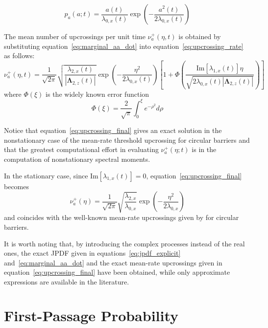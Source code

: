 \documentclass[11pt]{article}
\begin{document}
\begin{equation}
p_a(a; t) = \frac{a(t)}{\lambda_{0,x}(t)} \exp\left(-\frac{a^2(t)}{2\lambda_{0,x}(t)}\right)
\label{eq:marginal_a}
\end{equation}

The mean number of upcrossings per unit time $\nu_a^+(\eta, t)$ is obtained by substituting equation~\eqref{eq:marginal_aa_dot} into equation~\eqref{eq:upcrossing_rate} as follows:
\begin{equation}
\nu_a^+(\eta, t) = \frac{1}{\sqrt{2\pi}} \sqrt{\frac{\lambda_{2,x}(t)}{|\boldsymbol{\Lambda}_{2,z}(t)|}} \exp\left(-\frac{\eta^2}{2\lambda_{0,x}(t)}\right) \left[1 + \Phi\left(\frac{\mathrm{Im}[\lambda_{1,x}(t)]\eta}{\sqrt{2\lambda_{0,x}(t)|\boldsymbol{\Lambda}_{2,z}(t)|}}\right)\right]
\label{eq:upcrossing_final}
\end{equation}
where $\Phi(\xi)$ is the widely known error function
\begin{equation}
\Phi(\xi) = \frac{2}{\sqrt{\pi}} \int_0^{\xi} e^{-\rho^2} d\rho
\label{eq:error_function}
\end{equation}

Notice that equation~\eqref{eq:upcrossing_final} gives an exact solution in the nonstationary case of the mean-rate threshold upcrossing for circular barriers and that the greatest computational effort in evaluating $\nu_a^+(\eta; t)$ is in the computation of nonstationary spectral moments.

In the stationary case, since $\mathrm{Im}[\lambda_{1,x}(t)] = 0$, equation~\eqref{eq:upcrossing_final} becomes
\begin{equation}
\nu_a^+(\eta) = \frac{1}{\sqrt{2\pi}} \sqrt{\frac{\lambda_{2,x}}{\lambda_{0,x}}} \exp\left(-\frac{\eta^2}{2\lambda_{0,x}}\right)
\label{eq:stationary_upcrossing}
\end{equation}
and coincides with the well-known mean-rate upcrossings given by \cite{cramer1967} for circular barriers.

It is worth noting that, by introducing the complex processes instead of the real ones, the exact JPDF given in equations~\eqref{eq:jpdf_explicit} and~\eqref{eq:marginal_aa_dot} and the exact mean-rate upcrossings given in equation~\eqref{eq:upcrossing_final} have been obtained, while only approximate expressions are available in the literature.

\section{First-Passage Probability}
\label{sec:first_passage}
\end{document}

